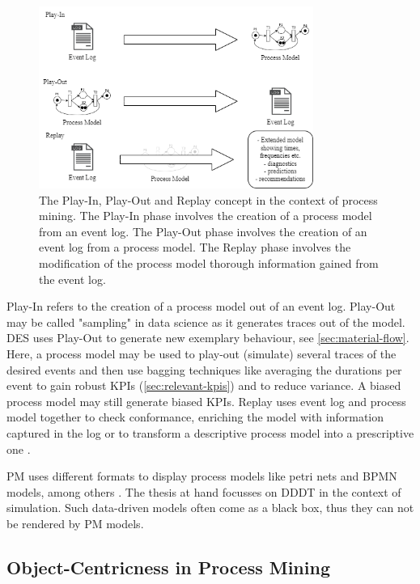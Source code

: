 \begin{figure}[htbp]
  \centering
  \includegraphics[width=0.8\textwidth]{figures/playinplayoutreplay.png}
  \caption{The Play-In, Play-Out and Replay concept in the context of process mining. The Play-In phase involves the creation of a process model from an event log. The Play-Out phase involves the creation of an event log from a process model. The Replay phase involves the modification of the process model thorough information gained from the event log.}
  \label{fig:playinoutreplay}
\end{figure}

Play-In refers to the creation of a process model out of an event log. Play-Out may be called "sampling" in data science as it generates traces out of the model. DES uses Play-Out to generate new exemplary behaviour, see \autoref{sec:material-flow}. Here, a process model may be used to play-out (simulate) several traces of the desired events and then use bagging techniques like averaging the durations per event to gain robust KPIs (\autoref{sec:relevant-kpis}) and to reduce variance. A biased process model may still generate biased KPIs. Replay uses event log and process model together to check conformance, enriching the model with information captured in the log or to transform a descriptive process model into a prescriptive one \autocite{van2016data}.

PM uses different formats to display process models like petri nets and BPMN models, among others \autocite{vanderAalst2012}. The thesis at hand focusses on DDDT in the context of simulation. Such data-driven models often come as a black box, thus they can not be rendered by PM models.


\subsection{Object-Centricness in Process Mining}
\label{sec:object-centric-event-logs}

